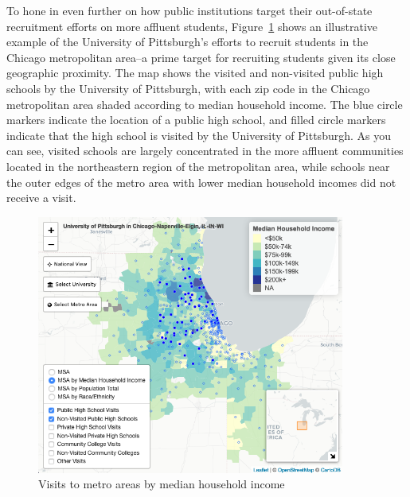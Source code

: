 \documentclass{article}
\begin{document}
To hone in even further on how public institutions target their out-of-state recruitment efforts on more affluent students, Figure~\ref{fig:income_map} shows an illustrative example of the University of Pittsburgh's efforts to recruit students in the Chicago metropolitan area--a prime target for recruiting students given its close geographic proximity. The map shows the visited and non-visited public high schools by the University of Pittsburgh, with each zip code in the Chicago metropolitan area shaded according to median household income. The blue circle markers indicate the location of a public high school, and filled circle markers indicate that the high school is visited by the University of Pittsburgh. As you can see, visited schools are largely concentrated in the more affluent communities located in the northeastern region of the metropolitan area, while schools near the outer edges of the metro area with lower median household incomes did not receive a visit.


\begin{figure}[!tp]
    \centering
    \includegraphics[width=0.9\textwidth]{assets/maps/income_map.png}
    \caption{Visits to metro areas by median household income}
    \label{fig:income_map}
\end{figure}
\end{document}
